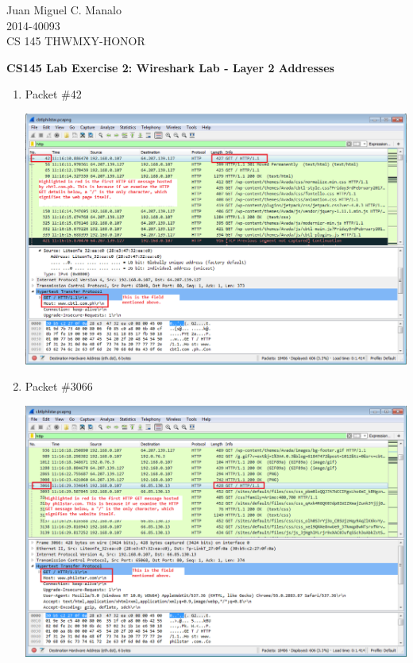 \documentclass[11pt]{article}
\begin{document}
\begin{flushleft}
Juan Miguel C. Manalo \\
2014-40093 \\
CS 145 THWMXY-HONOR
\end{flushleft}

\begin{center}
\textbf{CS145 Lab Exercise 2: Wireshark Lab - Layer 2 Addresses}
\end{center}

\begin{enumerate}
\item
Packet \#42
\begin{center}
\includegraphics[scale=0.4]{Q1}
\end{center}

\item
Packet \#3066
\begin{center}
\includegraphics[scale=0.4]{Q2}
\end{center}


\end{enumerate}
\end{document}
